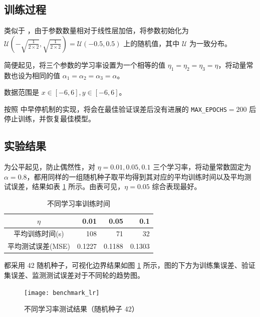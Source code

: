     \subsection{训练过程}

    类似于 \cite{torchlinear}，由于参数数量相对于线性层加倍，将参数初始化为 $\mathcal{U}\left(-\sqrt{\frac{1}{2\times 2}},\sqrt{\frac{1}{2\times 2}}\right)=\mathcal{U}(-0.5,0.5)$ 上的随机值，其中 $\mathcal{U}$ 为一致分布。

    简便起见，将三个参数的学习率设置为一个相等的值 $\eta_1=\eta_2=\eta_3=\eta$，将动量常数也设为相同的值 $\alpha_1=\alpha_2=\alpha_3=\alpha$。

    数据范围是 $x\in[-6,6],y\in[-6,6]$。

    按照 \cite{tfearly} 中早停机制的实现，将会在最佳验证误差后没有进展的 \texttt{MAX\_EPOCHS}$=200$ 后停止训练，并恢复最佳模型。


    \subsection{实验结果}

    为公平起见，防止偶然性，对 $\eta=0.01,0.05,0.1$ 三个学习率，将动量常数固定为 $\alpha=0.8$，都用同样的一组随机种子取平均得到其对应的平均训练时间以及平均测试误差，结果如表 \ref{tab:benchmark_lr} 所示。由表可见，$\eta=0.05$ 综合表现最好。

    \begin{table}[H]
        \centering
        \caption{不同学习率训练时间}\label{tab:benchmark_lr}
        \begin{tabular}{crrr}
            \toprule
            $\eta$ & 0.01 & 0.05 & 0.1 \\
            \midrule
            平均训练时间(s) & 108 & 71 & 32 \\
            平均测试误差(MSE) & 0.1227 & 0.1188 & 0.1303 \\
            \bottomrule
        \end{tabular}
    \end{table}

    都采用 42 随机种子，可视化边界结果如图 \ref{fig:benchmark_lr} 所示，图的下方为训练集误差、验证集误差、监测测试误差对于不同轮的趋势图。

    \begin{figure}[H]
        \centering
        \texttt{[image: benchmark\_lr]}
        \caption{不同学习率测试结果（随机种子 42）}\label{fig:benchmark_lr}
    \end{figure}

